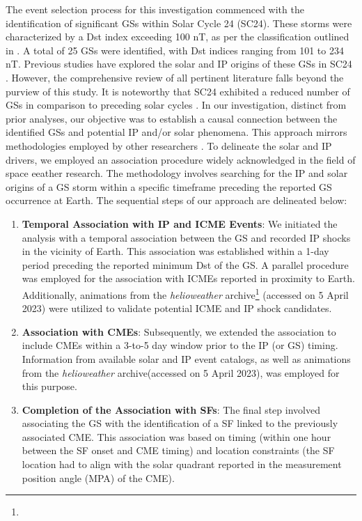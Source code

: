 The event selection process for this investigation commenced with the identification of significant GSs within Solar Cycle 24 (SC24). These storms were characterized by a Dst index exceeding 100 nT, as per the classification outlined in \citet{gonzalez_1994}. A total of 25 GSs were identified, with Dst indices ranging from 101 to 234 nT. Previous studies have explored the solar and IP origins of these GSs in SC24 \citep{gopalswamy_gs_2022, qiu_2022, besliu_2022, abe_2023}. However, the comprehensive review of all pertinent literature falls beyond the purview of this study. It is noteworthy that SC24 exhibited a reduced number of GSs in comparison to preceding solar cycles \citep{selvakumaran_2016}.
In our investigation, distinct from prior analyses, our objective was to establish a causal connection between the identified GSs and potential IP and/or solar phenomena. This approach mirrors methodologies employed by other researchers \citep{zhang_2007, gonzalez_2007, gopalswamy_2008, echer_2013, manu_2022}. To delineate the solar and IP drivers, we employed an association procedure widely acknowledged in the field of space eeather research. The methodology involves searching for the IP and solar origins of a GS storm within a specific timeframe preceding the reported GS occurrence at Earth. The sequential steps of our approach are delineated below:

\begin{enumerate}
	\item \textbf{Temporal Association with IP and ICME Events}:
	We initiated the analysis with a temporal association between the GS and recorded IP shocks in the vicinity of Earth. This association was established within a 1-day period preceding the reported minimum Dst of the GS. A parallel procedure was employed for the association with ICMEs reported in proximity to Earth. Additionally, animations from the \textit{helioweather} archive\footnote{\helioweatherurl} (accessed on 5 April 2023) were utilized to validate potential ICME and IP shock candidates.
	
	\item \textbf{Association with CMEs}:
	Subsequently, we extended the association to include CMEs within a 3-to-5 day window prior to the IP (or GS) timing. Information from available solar and IP event catalogs, as well as animations from the \textit{helioweather} archive\footnotemark[\value{footnote}] (accessed on 5 April 2023), was employed for this purpose.
	
	\item \textbf{Completion of the Association with SFs}:
	The final step involved associating the GS with the identification of a SF linked to the previously associated CME. This association was based on timing (within one hour between the SF onset and CME timing) and location constraints (the SF location had to align with the solar quadrant reported in the measurement position angle (MPA) of the CME).
\end{enumerate}

